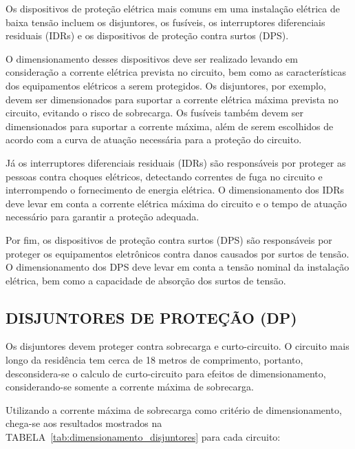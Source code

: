 Os dispositivos de proteção elétrica mais comuns em uma instalação elétrica de baixa tensão incluem os disjuntores, os fusíveis, os interruptores diferenciais residuais (IDRs) e os dispositivos de proteção contra surtos (DPS).

O dimensionamento desses dispositivos deve ser realizado levando em consideração a corrente elétrica prevista no circuito, bem como as características dos equipamentos elétricos a serem protegidos. Os disjuntores, por exemplo, devem ser dimensionados para suportar a corrente elétrica máxima prevista no circuito, evitando o risco de sobrecarga. Os fusíveis também devem ser dimensionados para suportar a corrente máxima, além de serem escolhidos de acordo com a curva de atuação necessária para a proteção do circuito.

Já os interruptores diferenciais residuais (IDRs) são responsáveis por proteger as pessoas contra choques elétricos, detectando correntes de fuga no circuito e interrompendo o fornecimento de energia elétrica. O dimensionamento dos IDRs deve levar em conta a corrente elétrica máxima do circuito e o tempo de atuação necessário para garantir a proteção adequada.

Por fim, os dispositivos de proteção contra surtos (DPS) são responsáveis por proteger os equipamentos eletrônicos contra danos causados por surtos de tensão. O dimensionamento dos DPS deve levar em conta a tensão nominal da instalação elétrica, bem como a capacidade de absorção dos surtos de tensão.

\subsection{DISJUNTORES DE PROTEÇÃO (DP)}

Os disjuntores devem proteger contra sobrecarga e curto-circuito. O circuito mais longo da residência tem cerca de 18 metros de comprimento, portanto, desconsidera-se o calculo de curto-circuito para efeitos de dimensionamento, considerando-se somente a corrente máxima de sobrecarga.

Utilizando a corrente máxima de sobrecarga como critério de dimensionamento, chega-se aos resultados mostrados na TABELA~\ref{tab:dimensionamento_disjuntores} para cada circuito:


